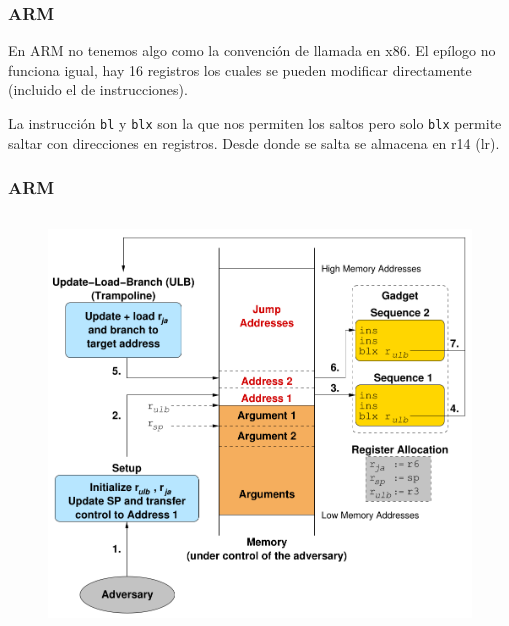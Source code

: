 \documentclass{beamer}
\newcommand { \vs } {\vspace{0.5cm}}
\begin{document}
\begin{frame}
    \frametitle{ARM}

    En ARM no tenemos algo como la convención de llamada en x86. El epílogo no funciona igual, hay 16 registros los cuales se pueden modificar directamente (incluido el de instrucciones).

    \vs

    La instrucción \texttt{bl} y \texttt{blx} son la que nos permiten los saltos pero solo \texttt{blx} permite saltar con direcciones en registros. Desde donde se salta se almacena en r14 (lr). 

\end{frame}

\begin{frame}
    \frametitle{ARM}
    \begin{columns}
            \begin{figure}
            \centering
                \includegraphics[scale=0.2]{ideaARM.png}
            \end{figure}
        \pause
\end{columns}
\end{frame}
\end{document}
